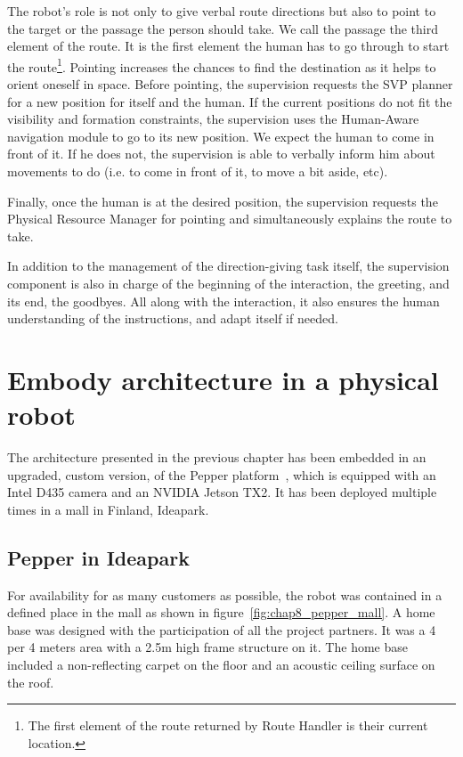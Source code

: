 The robot's role is not only to give verbal route directions but also to point to the target or the passage the person should take. We call the passage the third element of the route. It is the first element the human has to go through to start the route\footnote{The first element of the route returned by Route Handler is their current location.}. Pointing increases the chances to find the destination as it helps to orient oneself in space. Before pointing, the supervision requests the SVP planner for a new position for itself and the human. If the current positions do not fit the visibility and formation constraints, the supervision uses the Human-Aware navigation module to go to its new position. We expect the human to come in front of it. If he does not, the supervision is able to verbally inform him about movements to do (i.e. to come in front of it, to move a bit aside, etc).

Finally, once the human is at the desired position, the supervision requests the Physical Resource Manager for pointing and simultaneously explains the route to take.

In addition to the management of the direction-giving task itself, the supervision component is also in charge of the beginning of the interaction, the greeting, and its end, the goodbyes. All along with the interaction, it also ensures the human understanding of the instructions, and adapt itself if needed.

\section{Embody architecture in a physical robot}

The architecture presented in the previous chapter has been embedded in an upgraded, custom version, of the Pepper platform~\cite{caniot_2020_adapted}, which is equipped with an Intel D435 camera and an NVIDIA Jetson TX2. It has been deployed multiple times in a mall in Finland, Ideapark.

\subsection{Pepper in Ideapark}

For availability for as many customers as possible, the robot was contained in a defined place in the mall as shown in figure~\ref{fig:chap8_pepper_mall}. A home base was designed with the participation of all the project partners. It was a 4 per 4 meters area with a 2.5m high frame structure on it. The home base included a non-reflecting carpet on the floor and an acoustic ceiling surface on the roof.

